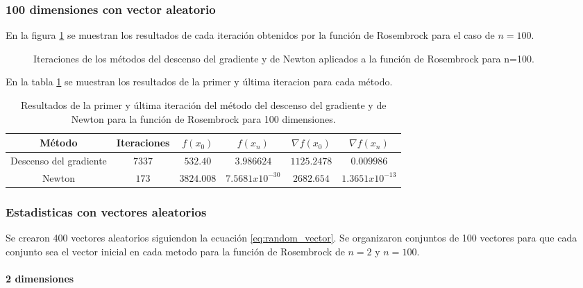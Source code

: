 \subsubsection{100 dimensiones con vector aleatorio}

En la figura \ref{fig:rosembrock_100_random} se muestran los resultados de cada iteración obtenidos por la función de Rosembrock para el caso de $n=100$.

\begin{figure}[H]
    \centering
    \caption{Iteraciones de los métodos del descenso del gradiente y de Newton aplicados a la función de Rosembrock para n=100.}
    \label{fig:rosembrock_100_random}
\end{figure}

En la tabla \ref{table:rosembrock_100_random} se muestran los resultados de la primer y última iteracion para cada método.

\begin{table}[H]
    \centering
    \begin{tabular}{cccccc} \hline
        Método                 & Iteraciones & $f(x_0)$   & $f(x_n)$          & $\nabla f(x_0)$ & $\nabla f(x_n) $  \\ \hline
        Descenso del gradiente & $7337$      & $532.40 $  & $3.986624$        & $1125.2478$     & $0.009986$        \\
        Newton                 & $173$       & $3824.008$ & $7.5681x10^{-30}$ & $2682.654$      & $1.3651x10^{-13}$ \\ \hline
    \end{tabular}
    \caption{Resultados de la primer y última iteración del método del descenso del gradiente y de Newton para la función de Rosembrock para 100 dimensiones.}
    \label{table:rosembrock_100_random}
\end{table}

\subsubsection{Estadisticas con vectores aleatorios}

Se crearon 400 vectores aleatorios siguiendon la ecuación \ref{eq:random_vector}. Se organizaron conjuntos de 100 vectores para que cada conjunto sea el vector inicial en cada metodo para la función de Rosembrock de $n=2$ y $n=100$.

\paragraph{2 dimensiones}

